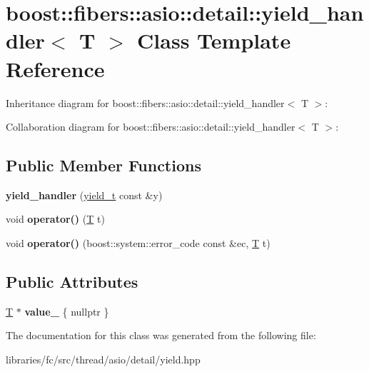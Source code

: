 \hypertarget{classboost_1_1fibers_1_1asio_1_1detail_1_1yield__handler}{}\section{boost\+:\+:fibers\+:\+:asio\+:\+:detail\+:\+:yield\+\_\+handler$<$ T $>$ Class Template Reference}
\label{classboost_1_1fibers_1_1asio_1_1detail_1_1yield__handler}


Inheritance diagram for boost\+:\+:fibers\+:\+:asio\+:\+:detail\+:\+:yield\+\_\+handler$<$ T $>$\+:


Collaboration diagram for boost\+:\+:fibers\+:\+:asio\+:\+:detail\+:\+:yield\+\_\+handler$<$ T $>$\+:
\subsection*{Public Member Functions}
\begin{DoxyCompactItemize}
\item 
\mbox{\label{classboost_1_1fibers_1_1asio_1_1detail_1_1yield__handler_aedacb32c8e27b1738b0682d0aa5ac848}} 
{\bfseries yield\+\_\+handler} (\mbox{\hyperlink{classboost_1_1fibers_1_1asio_1_1yield__t}{yield\+\_\+t}} const \&y)
\item 
\mbox{\label{classboost_1_1fibers_1_1asio_1_1detail_1_1yield__handler_af220a758767bf2d46032e3f520b488c2}} 
void {\bfseries operator()} (\mbox{\hyperlink{struct_t}{T}} t)
\item 
\mbox{\label{classboost_1_1fibers_1_1asio_1_1detail_1_1yield__handler_a1d0dc2d635f3efec48b90a42c1cc9398}} 
void {\bfseries operator()} (boost\+::system\+::error\+\_\+code const \&ec, \mbox{\hyperlink{struct_t}{T}} t)
\end{DoxyCompactItemize}
\subsection*{Public Attributes}
\begin{DoxyCompactItemize}
\item 
\mbox{\label{classboost_1_1fibers_1_1asio_1_1detail_1_1yield__handler_a417039875ebdb98f5bbfcbba0bfda143}} 
\mbox{\hyperlink{struct_t}{T}} $\ast$ {\bfseries value\+\_\+} \{ nullptr \}
\end{DoxyCompactItemize}


The documentation for this class was generated from the following file\+:\begin{DoxyCompactItemize}
\item 
libraries/fc/src/thread/asio/detail/yield.\+hpp\end{DoxyCompactItemize}
